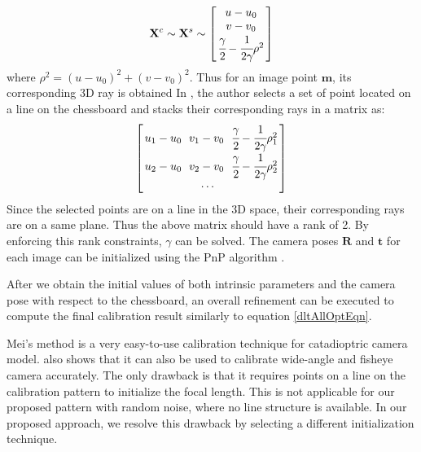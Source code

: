 \documentclass{report}
\begin{document}
\begin{equation}
\mathbf{X}^c \sim \mathbf{X}^s \sim
\arraycolsep=1.5pt%
\begin{bmatrix}
	\begin{array}{c}
	u - u_0 \\ v - v_0 \\ \cfrac{\gamma}{2} - \cfrac{1}{2 \gamma} \rho^2
	\end{array}
\end{bmatrix} 
\label{meiRayEqn}
\end{equation}
where $\rho^2 = (u - u_0)^2 + (v - v_0)^2$. Thus for an image point $\mathbf{m}$, its corresponding 3D ray is obtained In \cite{mei2007single}, the author selects a set of point located on a line on the chessboard and stacks their corresponding rays in a matrix as:
\begin{equation}
\arraycolsep=1.5pt%
\begin{bmatrix}
	\begin{array}{ccc}
	u_1 - u_0\  & v_1 - v_0\  & \cfrac{\gamma}{2} - \cfrac{1}{2 \gamma} \rho_1^2 \\
	u_2 - u_0\  & v_2 - v_0\  & \cfrac{\gamma}{2} - \cfrac{1}{2 \gamma} \rho_2^2 \\
	&\cdots	&
	\end{array}
\end{bmatrix} 
\end{equation}  
Since the selected points are on a line in the 3D space, their corresponding rays are on a same plane. Thus the above matrix should have a rank of 2. By enforcing this rank constraints, $\gamma$ can be solved. The camera poses $\mathbf{R}$ and $\mathbf{t}$ for each image can be initialized using the PnP algorithm \cite{gao2003complete}. 

After we obtain the initial values of both intrinsic parameters and the camera pose with respect to the chessboard, an overall refinement can be executed to compute the final calibration result similarly to equation \ref{dltAllOptEqn}. 

Mei's method is a very easy-to-use calibration technique for catadioptric camera model. \cite{mei2007single} also shows that it can also be used to calibrate wide-angle and fisheye camera accurately. The only drawback is that it requires points on a line on the calibration pattern to initialize the focal length. This is not applicable for our proposed pattern with random noise, where no line structure is available. In our proposed approach, we resolve this drawback by selecting a different initialization technique. 
\end{document}
